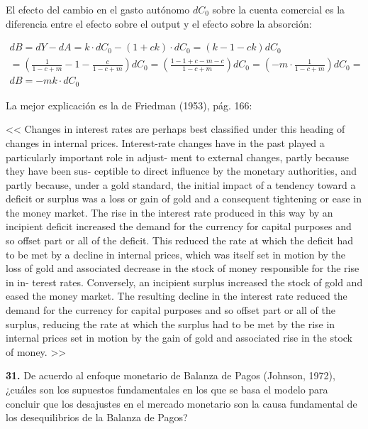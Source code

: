 \documentclass{nuevotema}
\begin{document}
\conceptos


El efecto del cambio en el gasto autónomo $d C_0$ sobre la cuenta comercial es la diferencia entre el efecto sobre el output y el efecto sobre la absorción:

\begin{align*}
d B = d Y - d A = k \cdot d C_0 - (1+ck) \cdot d C_0 = (k - 1 - ck) d C_0 \\
= \left( \frac{1}{1-c+m} - 1 - \frac{c}{1-c+m}\right) d C_0 = \left( \frac{1-1+c-m - c}{1-c+m}\right) d C_0 = \left( -m \cdot \frac{1}{1-c+m} \right) d C_0 = \\
d B = -m k \cdot d C_0
\end{align*}


La mejor explicación es la de Friedman (1953), pág. 166:

<< Changes in interest rates are perhaps best classified under
this heading of changes in internal prices. Interest-rate changes
have in the past played a particularly important role in adjust-
ment to external changes, partly because they have been sus-
ceptible to direct influence by the monetary authorities, and
partly because, under a gold standard, the initial impact of a
tendency toward a deficit or surplus was a loss or gain of gold
and a consequent tightening or ease in the money market. The
rise in the interest rate produced in this way by an incipient
deficit increased the demand for the currency for capital purposes
and so offset part or all of the deficit. This reduced the rate at
which the deficit had to be met by a decline in internal prices,
which was itself set in motion by the loss of gold and associated
decrease in the stock of money responsible for the rise in in-
terest rates. Conversely, an incipient surplus increased the stock
of gold and eased the money market. The resulting decline in
the interest rate reduced the demand for the currency for capital
purposes and so offset part or all of the surplus, reducing the
rate at which the surplus had to be met by the rise in internal
prices set in motion by the gain of gold and associated rise in
the stock of money. >>

\preguntas


\textbf{31.} De acuerdo al enfoque monetario de Balanza de Pagos (Johnson, 1972), ¿cuáles son los supuestos fundamentales en los que se basa el modelo para concluir que los desajustes en el mercado monetario son la causa fundamental de los desequilibrios de la Balanza de Pagos?
\end{document}
